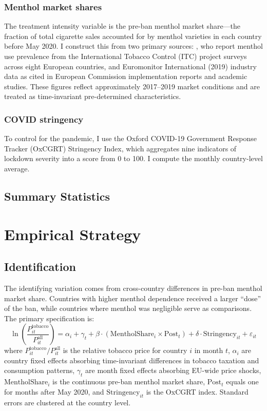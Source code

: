 \documentclass[12pt]{article}
\begin{document}
\subsubsection*{Menthol market shares} The treatment intensity variable is the pre-ban menthol market share---the fraction of total cigarette sales accounted for by menthol varieties in each country before May 2020. I construct this from two primary sources: \citet{laverty2018menthol}, who report menthol use prevalence from the International Tobacco Control (ITC) project surveys across eight European countries, and Euromonitor International (2019) industry data as cited in European Commission implementation reports and academic studies. These figures reflect approximately 2017--2019 market conditions and are treated as time-invariant pre-determined characteristics.

\subsubsection*{COVID stringency} To control for the pandemic, I use the Oxford COVID-19 Government Response Tracker (OxCGRT) Stringency Index, which aggregates nine indicators of lockdown severity into a score from 0 to 100. I compute the monthly country-level average.

\subsection{Summary Statistics}




\section{Empirical Strategy}

\subsection{Identification}

The identifying variation comes from cross-country differences in pre-ban menthol market share. Countries with higher menthol dependence received a larger ``dose'' of the ban, while countries where menthol was negligible serve as comparisons. The primary specification is:
\begin{equation}
\ln\left(\frac{P^{\text{tobacco}}_{it}}{P^{\text{all}}_{it}}\right) = \alpha_i + \gamma_t + \beta \cdot (\text{MentholShare}_i \times \text{Post}_t) + \delta \cdot \text{Stringency}_{it} + \varepsilon_{it}
\label{eq:main}
\end{equation}
where $P^{\text{tobacco}}_{it}/P^{\text{all}}_{it}$ is the relative tobacco price for country $i$ in month $t$, $\alpha_i$ are country fixed effects absorbing time-invariant differences in tobacco taxation and consumption patterns, $\gamma_t$ are month fixed effects absorbing EU-wide price shocks, $\text{MentholShare}_i$ is the continuous pre-ban menthol market share, $\text{Post}_t$ equals one for months after May 2020, and $\text{Stringency}_{it}$ is the OxCGRT index. Standard errors are clustered at the country level.
\end{document}
